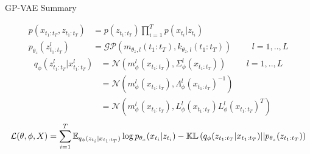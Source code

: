 \begin{frame}{GP-VAE Summary}
    \begin{tcolorbox}[colback=blue!5!white,colframe=black!75!black,title=Gaussian Process VAEs]
        \begin{align}
            \label{gen_model_gpvae}
            p(x_{t_1:t_T}, z_{t_1:t_T}) &= p(z_{t_1:t_T}) \prod_{i=1}^T p(x_{t_i} \vert z_{t_{i}}) \\
            p_{\theta_z}(z_{t_1:t_T}^l) &= \mathcal{GP}(m_{\theta_z, l}(t_1:t_T), k_{\theta_z, l}(t_1:t_T)) \hspace{1cm} l=1,..,L
        \end{align}
        \begin{align}
            \label{inf_model_gpvae}
            q_\phi(z_{t_1:t_T}^l \vert x_{t_1:t_T}^l) &= \mathcal{N}(m_{\phi}^l(x_{t_1:t_T}), \Sigma_{\phi}^l(x_{t_1:t_T})) \hspace{1cm} l=1,..,L \\
            &= \mathcal{N}(m_{\phi}^l(x_{t_1:t_T}), \Lambda_{\phi}^l(x_{t_1:t_T})^{-1}) \\
            &= \mathcal{N}(m_{\phi}^l(x_{t_1:t_T}), L_{\phi}^l(x_{t_1:t_T})L_{\phi}^l(x_{t_1:t_T})^T)
        \end{align}
        \begin{align}
            \label{vlb_gpvae}
            \mathcal{L}(\theta, \phi, X) = \sum_{i=1}^T \mathbb{E}_{q_{\phi}(z_{t_i} \vert x_{t_1:t_T})} \log{p_{\theta_x}(x_{t_i} \vert z_{t_i})} - \mathbb{KL}\left( q_{\phi}(z_{t_1:t_T} \vert x_{t_1:t_T}) \vert\vert p_{\theta_z}(z_{t_1:t_T}) \right) 
        \end{align}
    \end{tcolorbox}
\end{frame}

